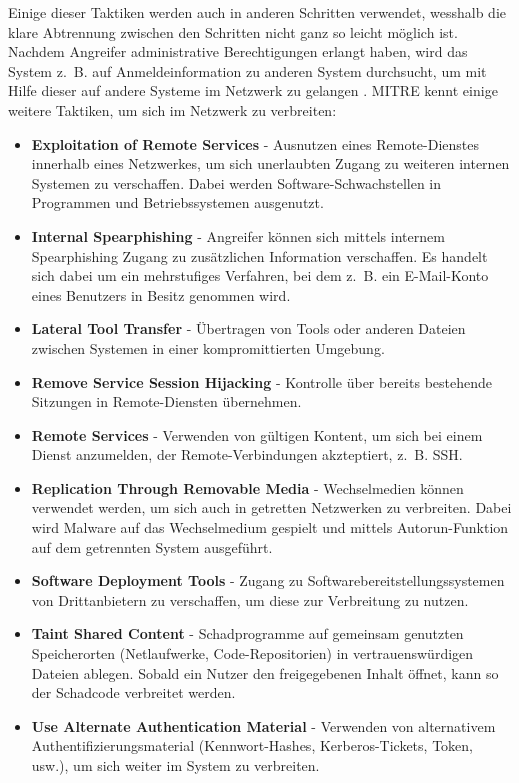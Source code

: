 \documentclass[conference]{IEEEtran}
\begin{document}
Einige dieser Taktiken werden auch in anderen Schritten verwendet, wesshalb die klare Abtrennung zwischen den Schritten nicht ganz so leicht möglich ist.
Nachdem Angreifer administrative Berechtigungen erlangt haben, wird das System z.~B. auf Anmeldeinformation zu anderen System durchsucht, um mit Hilfe dieser auf andere Systeme im Netzwerk zu gelangen \cite[S.~17]{Steffens2020}.
MITRE \cite{MITRELateralMovement} kennt einige weitere Taktiken, um sich im Netzwerk zu verbreiten:
\begin{itemize}
    \item \textbf{Exploitation of Remote Services} - Ausnutzen eines Remote-Dienstes innerhalb eines Netzwerkes, um sich unerlaubten Zugang zu weiteren internen Systemen zu verschaffen. Dabei werden Software-Schwachstellen in Programmen und Betriebssystemen ausgenutzt.
    \item \textbf{Internal Spearphishing} - Angreifer können sich mittels internem Spearphishing Zugang zu zusätzlichen Information verschaffen. Es handelt sich dabei um ein mehrstufiges Verfahren, bei dem z.~B. ein E-Mail-Konto eines Benutzers in Besitz genommen wird.
    \item \textbf{Lateral Tool Transfer} - Übertragen von Tools oder anderen Dateien zwischen Systemen in einer kompromittierten Umgebung.
    \item \textbf{Remove Service Session Hijacking} - Kontrolle über bereits bestehende Sitzungen in Remote-Diensten übernehmen.
    \item \textbf{Remote Services} - Verwenden von gültigen Kontent, um sich bei einem Dienst anzumelden, der Remote-Verbindungen akzteptiert, z.~B. SSH.
    \item \textbf{Replication Through Removable Media} - Wechselmedien können verwendet werden, um sich auch in getretten Netzwerken zu verbreiten. Dabei wird Malware auf das Wechselmedium gespielt und mittels Autorun-Funktion auf dem getrennten System ausgeführt.
    \item \textbf{Software Deployment Tools} - Zugang zu Softwarebereitstellungssystemen von Drittanbietern zu verschaffen, um diese zur Verbreitung zu nutzen.
    \item \textbf{Taint Shared Content} - Schadprogramme auf gemeinsam genutzten Speicherorten (Netlaufwerke, Code-Repositorien) in vertrauenswürdigen Dateien ablegen. Sobald ein Nutzer den freigegebenen Inhalt öffnet, kann so der Schadcode verbreitet werden.
    \item \textbf{Use Alternate Authentication Material} - Verwenden von alternativem Authentifizierungsmaterial (Kennwort-Hashes, Kerberos-Tickets, Token, usw.), um sich weiter im System zu verbreiten.
\end{itemize}
\end{document}
